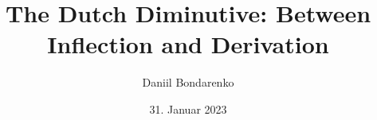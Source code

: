 
\title{The Dutch Diminutive: Between Inflection and Derivation} 
\newcommand{\Year}{2023}
\date{31. Januar \Year}
\newcommand{\thesisKind}{Bachelor}
\newcommand{\degree}{Bachelor~of~Arts~(B.A.)}
\newcommand{\versionnumber}{1}

\author{Daniil Bondarenko}
\newcommand{\matrikelno}{575836}
\newcommand{\email}{bondared@hu-berlin.de}

\newcommand{\fstAdvisor}{Prof.~Dr.~Dr.~h.c.~Artemis~Alexiadou}
\newcommand{\fstAdvisorsUniversity}{Humboldt-Universität zu Berlin} 
\newcommand{\fstAdvisorsDepartment}{Sprach- und literaturwissenschaftliche Fakultät} 
\newcommand{\fstAdvisorsAG}{Institut für Anglistik und Amerikanistik}
\newcommand{\fstAdvisorsCountry}{Deutschland}

\newcommand{\sndAdvisor}{Prof.~Dr.~Markus~Egg}
\newcommand{\sndAdvisorsUniversity}{Humboldt-Universität zu Berlin} %
\newcommand{\sndAdvisorsDepartment}{Sprach- und literaturwissenschaftliche Fakultät}
\newcommand{\sndAdvisorsAG}{Institut für Anglistik und Amerikanistik}
\newcommand{\sndAdvisorsCountry}{Deutschland}










